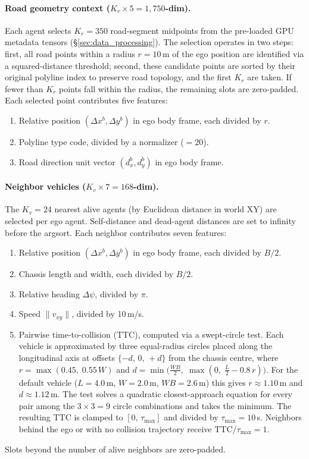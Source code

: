 \paragraph{Road geometry context ($K_r \times 5 = 1{,}750$-dim).}
Each agent selects $K_r = 350$ road-segment midpoints from the pre-loaded GPU metadata tensors (\S\ref{sec:data_processing}).
The selection operates in two steps: first, all road points within a radius $r = 10$\,m of the ego position are identified via a squared-distance threshold; second, these candidate points are sorted by their original polyline index to preserve road topology, and the first $K_r$ are taken.
If fewer than $K_r$ points fall within the radius, the remaining slots are zero-padded.
Each selected point contributes five features:
\begin{enumerate}[leftmargin=*, itemsep=1pt]
  \item Relative position $(\Delta x^b, \Delta y^b)$ in ego body frame, each divided by $r$.
  \item Polyline type code, divided by a normalizer ($= 20$).
  \item Road direction unit vector $(d_x^b, d_y^b)$ in ego body frame.
\end{enumerate}

\paragraph{Neighbor vehicles ($K_v \times 7 = 168$-dim).}
The $K_v = 24$ nearest alive agents (by Euclidean distance in world XY) are selected per ego agent.
Self-distance and dead-agent distances are set to infinity before the argsort.
Each neighbor contributes seven features:
\begin{enumerate}[leftmargin=*, itemsep=1pt]
  \item Relative position $(\Delta x^b, \Delta y^b)$ in ego body frame, each divided by $B/2$.
  \item Chassis length and width, each divided by $B/2$.
  \item Relative heading $\Delta\psi$, divided by $\pi$.
  \item Speed $\|v_{xy}\|$, divided by 10\,m/s.
  \item Pairwise time-to-collision (TTC), computed via a swept-circle test.
    Each vehicle is approximated by three equal-radius circles placed along the longitudinal axis at offsets $\{-d,\, 0,\, +d\}$ from the chassis centre, where $r = \max(0.45,\; 0.55\, W)$ and $d = \min\!\bigl(\tfrac{\mathit{WB}}{2},\; \max(0,\; \tfrac{L}{2} - 0.8\,r)\bigr)$.
    For the default vehicle ($L{=}4.0$\,m, $W{=}2.0$\,m, $\mathit{WB}{=}2.6$\,m) this gives $r \approx 1.10$\,m and $d \approx 1.12$\,m.
    The test solves a quadratic closest-approach equation for every pair among the $3 \times 3 = 9$ circle combinations and takes the minimum.
    The resulting TTC is clamped to $[0,\, \tau_{\max}]$ and divided by $\tau_{\max} = 10$\,s.
    Neighbors behind the ego or with no collision trajectory receive $\mathrm{TTC}/\tau_{\max} = 1$.
\end{enumerate}
Slots beyond the number of alive neighbors are zero-padded.


